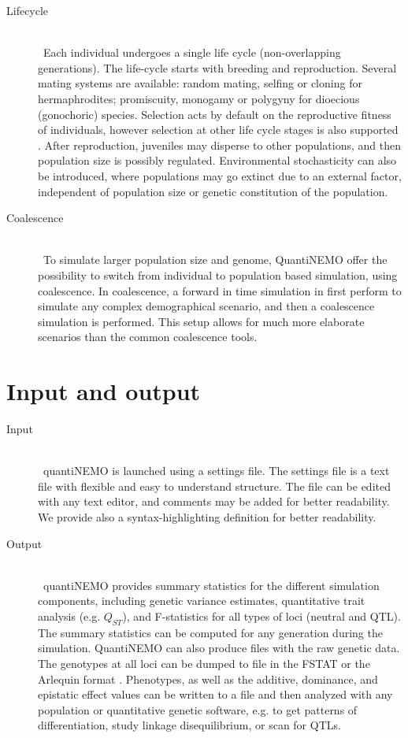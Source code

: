 \documentclass[letterpaper,12pt,oneside]{book}
\begin{document}
\begin{description}
\item[Lifecycle]\hspace*{\fill}\\\
Each individual undergoes a single life cycle (non-overlapping generations). The life-cycle starts with breeding and reproduction. Several mating systems are available: random mating, selfing or cloning for hermaphrodites; promiscuity, monogamy or polygyny for dioecious (gonochoric) species. Selection acts by default on the reproductive fitness of individuals, however selection at other life cycle stages is also supported . After reproduction, juveniles may disperse to other populations, and then population size is possibly regulated. Environmental stochasticity can also be introduced, where populations may go extinct due to an external factor, independent of population size or genetic constitution of the population.

\item[Coalescence]\hspace*{\fill}\\\
To simulate larger population size and genome, QuantiNEMO offer the possibility to switch from individual to population based simulation, using coalescence. In coalescence, a forward in time simulation in first perform to simulate any complex demographical scenario, and then a coalescence simulation is performed. This setup allows for much more elaborate scenarios than the common coalescence tools. 
\end{description}


\section{Input and output}
\begin{description}
\item[Input]\hspace*{\fill}\\\
quantiNEMO is launched using a settings file. The settings file is a text file with flexible and easy to understand structure. The file can be edited with any text editor, and comments may be added for better readability. We provide also a syntax-highlighting definition for better readability.  

\item[Output]\hspace*{\fill}\\\
quantiNEMO provides summary statistics for the different simulation components, including genetic variance estimates, quantitative trait analysis (e.g. $Q_{ST}$), and F-statistics for all types of loci (neutral and QTL). The summary statistics can be computed for any generation during the simulation. QuantiNEMO can also produce files with the raw genetic data. The genotypes at all loci can be dumped to file in the FSTAT \citep{Goudet_1995} or the Arlequin format \citep{Excoffier_2010}. Phenotypes, as well as the additive, dominance, and epistatic effect values can be written to a file and then analyzed with any population or quantitative genetic software, e.g.  to get patterns of differentiation, study linkage disequilibrium, or scan for QTLs.
\end{description}
\end{document}
